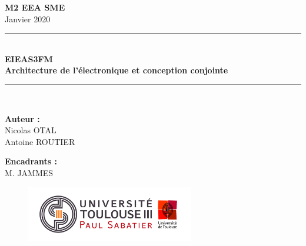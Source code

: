 \begin{titlepage}
    \begin{center}
    \huge{\textbf{M2 EEA SME}}\\[0.5 cm]
    {\large Janvier 2020}\\[0.5cm]
    
    \rule{\linewidth}{0.5mm} \\[0.4cm]
    {\huge \bfseries EIEAS3FM \\ Architecture de l'électronique et conception conjointe \\[0.4cm]}
    \rule{\linewidth}{0.5mm} \\[1.5cm]
    
    
    
    \begin{center}
    \begin{minipage}[t]{0.46\textwidth}
      \begin{flushleft} \large
        \textbf{Auteur :}\\
        Nicolas OTAL\\
        Antoine ROUTIER\\
      \end{flushleft}
    \end{minipage}
    \begin{minipage}[t]{0.46\textwidth}
      \begin{flushright} \large
        \textbf{Encadrants :}\\
        M. JAMMES\\
      \end{flushright}
    \end{minipage}
    \end{center}
    
    \vfill
    
    
    \begin{figure}[b]
    \centering
    \includegraphics[width=0.65\textwidth]{images/Upstls.jpg}
    \end{figure}
    
    \end{center}
    \end{titlepage}